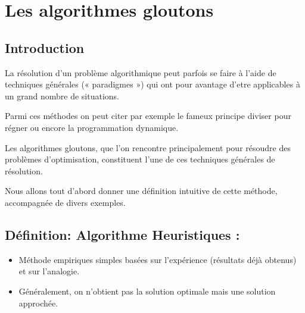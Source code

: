 \documentclass[letterpaper,10pt,english]{jupyterBook}
\begin{document}
\chapter{Les algorithmes gloutons}
\label{\detokenize{notebooks/dynamicProgramming/glouton:les-algorithmes-gloutons}}\label{\detokenize{notebooks/dynamicProgramming/glouton::doc}}

\section{Introduction}
\label{\detokenize{notebooks/dynamicProgramming/glouton:introduction}}
\sphinxAtStartPar
La résolution d’un problème algorithmique peut parfois se faire à l’aide de techniques générales (« paradigmes ») qui ont pour avantage d’etre applicables à un grand nombre de situations.

\sphinxAtStartPar
Parmi ces méthodes on peut citer par exemple le fameux principe diviser pour régner ou encore la programmation dynamique.

\sphinxAtStartPar
Les algorithmes gloutons, que l’on rencontre principalement pour résoudre des
problèmes d’optimisation, constituent l’une de ces techniques générales de résolution.

\sphinxAtStartPar
Nous allons tout d’abord donner une définition intuitive de cette méthode, accompagnée de divers exemples.


\section{Définition: Algorithme Heuristiques :}
\label{\detokenize{notebooks/dynamicProgramming/glouton:definition-algorithme-heuristiques}}\begin{itemize}
\item {} 
\sphinxAtStartPar
Méthode empiriques simples basées sur l’expérience (résultats déjà obtenus) et sur l’analogie.

\item {} 
\sphinxAtStartPar
Généralement, on n’obtient pas la solution optimale mais une solution approchée.

\end{itemize}
\end{document}
